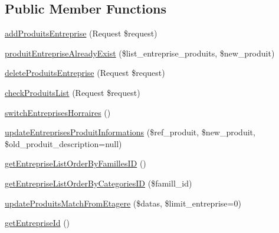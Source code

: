 \subsection*{Public Member Functions}
\begin{DoxyCompactItemize}
\item 
\mbox{\hyperlink{class_app_1_1_http_1_1_controllers_1_1_entreprise_informations_controller_ab5536b07a95afe94cc030823a5035290}{add\+Produits\+Entreprise}} (Request \$request)
\item 
\mbox{\hyperlink{class_app_1_1_http_1_1_controllers_1_1_entreprise_informations_controller_a5b2ccff5adc6a22fb564e8643986ece4}{produit\+Entreprise\+Already\+Exist}} (\$list\+\_\+entreprise\+\_\+produits, \$new\+\_\+produit)
\item 
\mbox{\hyperlink{class_app_1_1_http_1_1_controllers_1_1_entreprise_informations_controller_a42b30870ac7ce4725ffc234183f4e331}{delete\+Produits\+Entreprise}} (Request \$request)
\item 
\mbox{\hyperlink{class_app_1_1_http_1_1_controllers_1_1_entreprise_informations_controller_af31f08f3b3ef10a1df30897210dee294}{check\+Produits\+List}} (Request \$request)
\item 
\mbox{\hyperlink{class_app_1_1_http_1_1_controllers_1_1_entreprise_informations_controller_ab6f594e522b41b417c366e103aab1f4e}{switch\+Entreprises\+Horraires}} ()
\item 
\mbox{\hyperlink{class_app_1_1_http_1_1_controllers_1_1_entreprise_informations_controller_a90e6a926e983be1b73b66cb5da9193aa}{update\+Entreprises\+Produit\+Informations}} (\$ref\+\_\+produit, \$new\+\_\+produit, \$old\+\_\+produit\+\_\+description=null)
\item 
\mbox{\hyperlink{class_app_1_1_http_1_1_controllers_1_1_entreprise_informations_controller_af0548f94d857e65df06711c3e8b210e6}{get\+Entreprise\+List\+Order\+By\+Familles\+ID}} ()
\item 
\mbox{\hyperlink{class_app_1_1_http_1_1_controllers_1_1_entreprise_informations_controller_a681d52d42bbab00e63d6ff73f534587c}{get\+Entreprise\+List\+Order\+By\+Categories\+ID}} (\$famill\+\_\+id)
\item 
\mbox{\hyperlink{class_app_1_1_http_1_1_controllers_1_1_entreprise_informations_controller_af0e4bc39c5f6c35e06ec490143ca3c69}{update\+Produits\+Match\+From\+Etagere}} (\$datas, \$limit\+\_\+entreprise=0)
\item 
\mbox{\hyperlink{class_app_1_1_http_1_1_controllers_1_1_entreprise_informations_controller_a87e457b19692deffd1d832f4dbb9a7e1}{get\+Entreprise\+Id}} ()

\end{DoxyCompactItemize}
